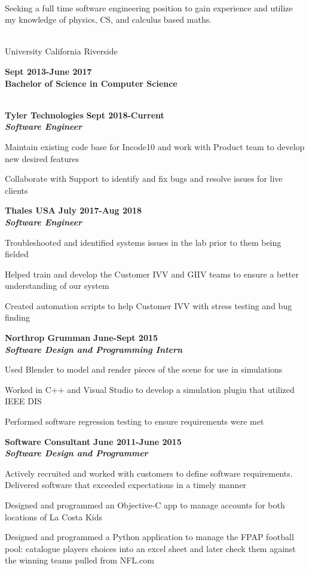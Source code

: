 \documentclass[10pt]{article}
\newcommand{\thing}[1][]{\item #1}
\newcommand{\sectionheader}[1]{
    \vspace{3pt}
    \StrSplit{#1}{3}{\firstpart}{\lastpart} %
    \textbf{\LARGE
        \firstpart
        \lastpart
    }\\[5pt]
}
\newcommand{\dates}[2]{
    \textbf{#1-#2}
}
\begin{document}
    \sectionheader{Objective}
    Seeking a full time software engineering position to gain 
    experience and utilize my knowledge of physics, CS, 
    and calculus based maths.
    
    \sectionheader{Education}
    University California Riverside \hfill %
    \dates{Sept 2013}{June 2017}\\
    \textbf{Bachelor of Science in Computer Science}
    
    \sectionheader{Experience}
    \textbf{\large Tyler Technologies} \hfill \dates{Sept 2018}{Current}\\
    \textit{\textbf{Software Engineer}}
    \begin{things}
        \thing Maintain existing code base for Incode10
                    and work with Product team to develop new desired features
        \thing Collaborate with Support to identify and fix bugs and resolve
                    issues for live clients
    \end{things}

    \textbf{\large Thales USA} \hfill \dates{July 2017}{Aug 2018}\\
    \textit{\textbf{Software Engineer}}
    \begin{things}
        \thing Troubleshooted and identified systems issues in 
                    the lab prior to them being fielded
        \thing Helped train and develop the Customer IVV and 
                    GIIV teams to ensure a better understanding of our system
        \thing Created automation scripts to help Customer IVV
                with stress testing and bug finding
    \end{things}

    \textbf{\large Northrop Grumman} \hfill \dates{June}{Sept 2015}\\
    \textit{\textbf{Software Design and Programming Intern}}
    \begin{things}
        \thing Used Blender to model and render pieces of the scene
                for use in simulations
        \thing Worked in C++ and Visual Studio to develop a simulation
                plugin that utilized IEEE DIS
        \thing Performed software regression testing to ensure requirements
                were met
    \end{things}

    \textbf{\large Software Consultant} \hfill \dates{June 2011}{June 2015}\\
    \textit{\textbf{Software Design and Programmer}}
    \begin{things}
        \thing Actively recruited and worked with customers to define
                software requirements. Delivered software that exceeded
                expectations in a timely manner
        \thing Designed and programmed an Objective-C app to manage
                accounts for both locations of La Costa Kids
        \thing Designed and programmed a Python application to manage
                the FPAP football pool: catalogue players choices
                into an excel sheet and later check them against the
                winning teams pulled from NFL.com
    \end{things}
\end{document}
